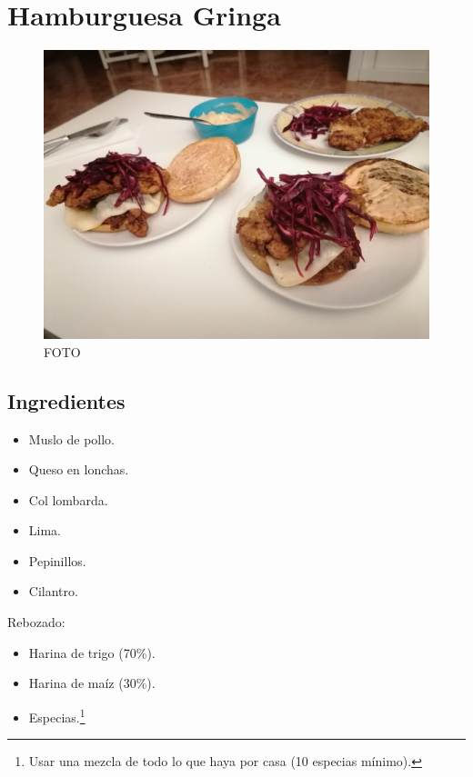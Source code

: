 \documentclass[
]{book}
\providecommand{\tightlist}{%
  \setlength{\itemsep}{0pt}\setlength{\parskip}{0pt}}
\begin{document}
\hypertarget{hamburguesa-gringa}{%
\chapter{Hamburguesa Gringa}\label{hamburguesa-gringa}}

\begin{figure}
\centering
\includegraphics{images/gringa.jpg}
\caption{FOTO}
\end{figure}

\hypertarget{ingredientes-3}{%
\section*{Ingredientes}\label{ingredientes-3}}

\begin{itemize}
\tightlist
\item
  Muslo de pollo.
\item
  Queso en lonchas.
\item
  Col lombarda.
\item
  Lima.
\item
  Pepinillos.
\item
  Cilantro.
\end{itemize}

Rebozado:

\begin{itemize}
\tightlist
\item
  Harina de trigo (70\%).
\item
  Harina de maíz (30\%).
\item
  Especias.\footnote{Usar una mezcla de todo lo que haya por casa (10 especias mínimo).}
\end{itemize}
\end{document}
